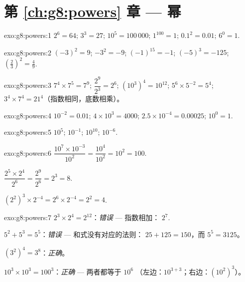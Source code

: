 \section*{第 \ref{ch:g8:powers} 章 --- 幂}

\begin{solution}{exo:g8:powers:1}
$2^6 = 64$; \quad $3^3 = 27$; \quad $10^5 = 100\,000$; \quad
$1^{100} = 1$; \quad $0.1^2 = 0.01$; \quad $6^0 = 1$.
\end{solution}

\begin{solution}{exo:g8:powers:2}
$(-3)^2 = 9$; \quad $-3^2 = -9$; \quad $(-1)^{15} = -1$; \quad
$(-5)^3 = -125$; \quad $\left(\frac23\right)^2 = \frac49$.
\end{solution}

\begin{solution}{exo:g8:powers:3}
$7^4 \times 7^5 = 7^9$; \quad
$\dfrac{2^9}{2^3} = 2^6$; \quad
$\left(10^3\right)^4 = 10^{12}$; \quad
$5^6 \times 5^{-2} = 5^4$; \quad
$3^4 \times 7^4 = 21^4$（指数相同，底数相乘）。
\end{solution}

\begin{solution}{exo:g8:powers:4}
$10^{-2} = 0.01$; \quad
$4 \times 10^3 = 4000$; \quad
$2.5 \times 10^{-4} = 0.00025$; \quad
$10^0 = 1$.
\end{solution}

\begin{solution}{exo:g8:powers:5}
$10^5$; \quad $10^{-1}$; \quad $10^{10}$; \quad $10^{-6}$.
\end{solution}

\begin{solution}{exo:g8:powers:6}
$\dfrac{10^7 \times 10^{-3}}{10^2} = \dfrac{10^4}{10^2} = 10^2 =
100$.

$\dfrac{2^5 \times 2^4}{2^6} = \dfrac{2^9}{2^6} = 2^3 = 8$.

$\left(2^2\right)^3 \times 2^{-4} = 2^6 \times 2^{-4} = 2^2 = 4$.
\end{solution}

\begin{solution}{exo:g8:powers:7}
$2^3 \times 2^4 = 2^{12}$：\emph{错误} --- 指数相加：
$2^7$.

$5^2 + 5^3 = 5^5$：\emph{错误} --- 和式没有对应的法则：
$25 + 125 = 150$，而 $5^5 = 3125$。

$(3^2)^4 = 3^8$：\emph{正确}。

$10^3 \times 10^3 = 100^3$：\emph{正确} --- 两者都等于 $10^6$
（左边：$10^{3+3}$；右边：$(10^2)^3$）。
\end{solution}

